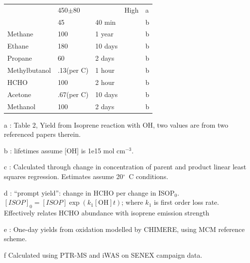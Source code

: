 \begin{table}
\begin{threeparttable}
\begin{tabular}{  l  l  l  l  l  }
            & 450$\pm$80      &        & High          & a      \\ 
            & 45              & 40 min &              & b      \\ %
            Methane 	      & 100             & 1 year  &             & b     \\ 
            Ethane          & 180             & 10 days &             & b     \\ 
            Propane         & 60              & 2 days  &             & b     \\ 
            Methylbutanol   & .13(per C)    & 1 hour  &             & b     \\ 
            HCHO            & 100             & 2 hour  &             & b     \\ 
            Acetone         & .67(per C)      & 10 days &             & b     \\ 
            Methanol        & 100             & 2 days  &             & b     \\ %
            \bottomrule
          \end{tabular}
          \begin{tablenotes} %
            \item a \textcite{AtkinsonArey2003}: Table 2, Yield from Isoprene reaction with OH, two values are from two referenced papers therein.
            \item b \textcite{Palmer2003}: lifetimes assume [OH] is 1e15 mol cm$^{-3}$.
            \item c \parencite{Lee2006}: Calculated through change in concentration of parent and product linear least squares regression.
            Estimates assume 20$^\circ$~C conditions.
            \item d \textcite{Wolfe2016}: ``prompt yield'': change in HCHO per change in ISOP$_0$.
            $[ISOP]_0=[ISOP]\exp(k_1[\mathrm{OH}]t)$; where $k_1$ is first order loss rate.
            Effectively relates HCHO abundance with isoprene emission strength
            \item e \textcite{Dufour2009}: One-day yields from oxidation modelled by CHIMERE, using MCM reference scheme.
            \item f Calculated using PTR-MS and iWAS on SENEX campaign data.
          \end{tablenotes}
          \label{BioIsop:Method:tab_VOCLiteratureYields}
        \end{threeparttable} \end{table}
        
